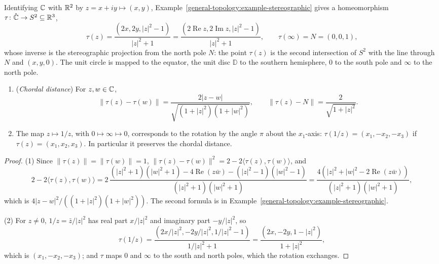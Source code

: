 Identifying $\mathbb{C}$ with $\mathbb{R}^2$ by $z = x + iy \mapsto (x, y)$, Example~\ref{general-topology:example-stereographic} gives a homeomorphism $\tau \colon \hat{\mathbb{C}} \to S^2 \subseteq \mathbb{R}^3$,
\[
\tau(z) = \frac{(2x, 2y, |z|^2 - 1)}{|z|^2 + 1} = \frac{(2\operatorname{Re}z, 2\operatorname{Im}z, |z|^2 - 1)}{|z|^2 + 1}, \qquad \tau(\infty) = N = (0, 0, 1),
\]
whose inverse is the stereographic projection from the north pole $N$: the point $\tau(z)$ is the second intersection of $S^2$ with the line through $N$ and $(x, y, 0)$. The unit circle is mapped to the
equator, the unit disc $\mathbb{D}$ to the southern hemisphere, $0$ to the south pole and $\infty$ to the north pole.

\begin{proposition}\label{complex-analysis:proposition-chordal}
\begin{enumerate}
\item (\emph{Chordal distance}) For $z, w \in \mathbb{C}$,
\[
\|\tau(z) - \tau(w)\| = \frac{2|z - w|}{\sqrt{(1 + |z|^2)(1 + |w|^2)}}, \qquad \|\tau(z) - N\| = \frac{2}{\sqrt{1 + |z|^2}}.
\]
\item The map $z \mapsto 1/z$, with $0 \mapsto \infty \mapsto 0$, corresponds to the rotation by the angle $\pi$ about the $x_1$-axis: $\tau(1/z) = (x_1, -x_2, -x_3)$ if $\tau(z) = (x_1, x_2, x_3)$. In particular it
preserves the chordal distance.
\end{enumerate}
\end{proposition}

\begin{proof}
(1) Since $\|\tau(z)\| = \|\tau(w)\| = 1$, $\|\tau(z) - \tau(w)\|^2 = 2 - 2\langle\tau(z), \tau(w)\rangle$, and
\[
2 - 2\langle\tau(z), \tau(w)\rangle = 2\,\frac{(|z|^2 + 1)(|w|^2 + 1) - 4\operatorname{Re}(z\bar w) - (|z|^2 - 1)(|w|^2 - 1)}{(|z|^2 + 1)(|w|^2 + 1)}
= \frac{4(|z|^2 + |w|^2 - 2\operatorname{Re}(z\bar w))}{(|z|^2 + 1)(|w|^2 + 1)},
\]
which is $4|z - w|^2/((1 + |z|^2)(1 + |w|^2))$. The second formula is in Example~\ref{general-topology:example-stereographic}.

(2) For $z \neq 0$, $1/z = \bar z/|z|^2$ has real part $x/|z|^2$ and imaginary part $-y/|z|^2$, so
\[
\tau(1/z) = \frac{(2x/|z|^2, -2y/|z|^2, 1/|z|^2 - 1)}{1/|z|^2 + 1} = \frac{(2x, -2y, 1 - |z|^2)}{1 + |z|^2},
\]
which is $(x_1, -x_2, -x_3)$; and $\tau$ maps $0$ and $\infty$ to the south and north poles, which the rotation exchanges.
\end{proof}

